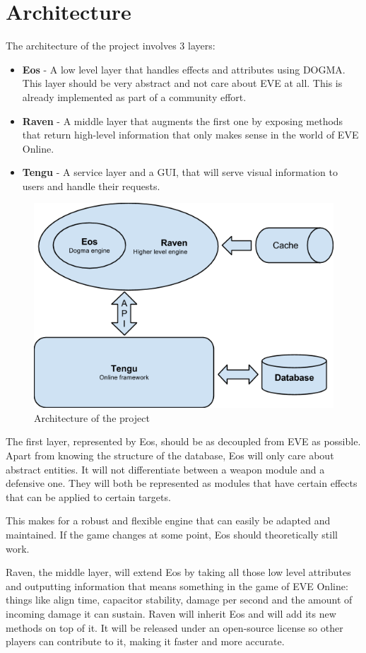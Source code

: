 \chapter{Architecture}
\label{chapter:arch}

The architecture of the project involves 3 layers:
\begin{itemize}
\item \textbf{Eos} - A low level layer that handles effects and attributes using DOGMA. This layer should be very abstract and not care about EVE at all. This is already implemented as part of a community effort.
\item \textbf{Raven} - A middle layer that augments the first one by exposing methods that return high-level information that only makes sense in the world of EVE Online.
\item \textbf{Tengu} - A service layer and a GUI, that will serve visual information to users and handle their requests.
\end{itemize}

\begin{figure}[h]
\centering
\includegraphics[width=0.7\linewidth]{src/img/arch}
\caption{Architecture of the project}
\label{fig:arch}
\end{figure}

The first layer, represented by Eos, should be as decoupled from EVE as possible. Apart from knowing the structure of the database, Eos will only care about abstract entities. It will not differentiate between a weapon module and a defensive one. They will both be represented as modules that have certain effects that can be applied to certain targets.

This makes for a robust and flexible engine that can easily be adapted and maintained. If the game changes at some point, Eos should theoretically still work.

Raven, the middle layer, will extend Eos by taking all those low level attributes and outputting information that means something in the game of EVE Online: things like align time, capacitor stability, damage per second and the amount of incoming damage it can sustain. Raven will inherit Eos and will add its new methods on top of it. It will be released under an open-source license so other players can contribute to it, making it faster and more accurate.

